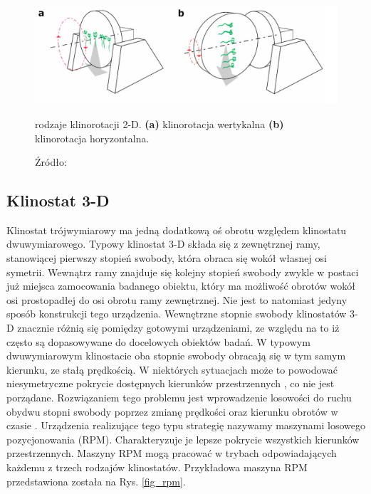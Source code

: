 \begin{figure}
	
	\centering

	\includegraphics[scale=0.9]{klinorotacje}
		\caption{rodzaje klinorotacji 2-D. \textbf{(a)} klinorotacja wertykalna \textbf{(b)}
		klinorotacja horyzontalna.} 
	\caption*{Źródło: \cite{bib:klinorotacja}}
	\label{fig_klinorotacje}
	
\end{figure}

\subsection{Klinostat 3-D} \label{klinostat3d}

Klinostat trójwymiarowy ma jedną dodatkową oś obrotu względem klinostatu dwuwymiarowego.
 Typowy klinostat 3-D składa się z zewnętrznej ramy, stanowiącej pierwszy stopień
  swobody, która obraca się wokół własnej osi symetrii. Wewnątrz ramy znajduje się
   kolejny stopień swobody zwykle w postaci już miejsca zamocowania badanego obiektu,
    który ma możliwość obrotów wokół osi prostopadłej do osi obrotu ramy zewnętrznej.
     Nie jest to natomiast jedyny sposób konstrukcji tego urządzenia. Wewnętrzne stopnie
      swobody klinostatów 3-D znacznie różnią się pomiędzy gotowymi urządzeniami, ze
       względu na to iż często są dopasowywane do docelowych obiektów badań. W typowym
        dwuwymiarowym klinostacie oba stopnie swobody obracają się w tym samym kierunku,
         ze stałą prędkością. W niektórych sytuacjach może to powodować niesymetryczne
          pokrycie dostępnych kierunków przestrzennych \cite{bib:rpmy}, co nie jest
           porządane. Rozwiązaniem tego problemu jest wprowadzenie losowości do ruchu
            obydwu stopni swobody poprzez zmianę prędkości oraz kierunku obrotów w
             czasie \cite{bib:rpmy}. Urządzenia realizujące tego typu strategię nazywamy
              maszynami losowego pozycjonowania (RPM). Charakteryzuje je lepsze pokrycie
               wszystkich kierunków przestrzennych. Maszyny RPM mogą pracować w trybach
                odpowiadających każdemu z trzech rodzajów klinostatów. Przykładowa
                 maszyna RPM przedstawiona została na Rys. \ref{fig_rpm}.

